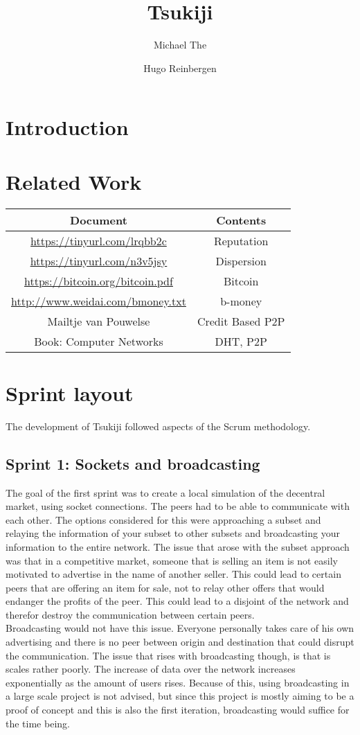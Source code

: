 \documentclass[]{article}
\title{Tsukiji}
\author{Michael The \and Hugo Reinbergen}
\begin{document}
\maketitle

\begin{abstract}

\end{abstract}

\section{Introduction}
\section{Related Work}
\begin{tabular}{|c|c|}
 \hline
 Document & Contents  \\
 \hline
 \url{https://tinyurl.com/lrqbb2c} & Reputation \\
 \url{https://tinyurl.com/n3v5jsy} & Dispersion \\
 \url{https://bitcoin.org/bitcoin.pdf} & Bitcoin \\
 \url{http://www.weidai.com/bmoney.txt} & b-money \\
 Mailtje van Pouwelse & Credit Based P2P \\
 Book: Computer Networks & DHT, P2P \\
 \hline
\end{tabular} 
\section{Sprint layout}
The development of Tsukiji followed aspects of the Scrum methodology.
\subsection{Sprint 1: Sockets and broadcasting}
The goal of the first sprint was to create a local simulation of the decentral market, using socket connections. The peers had to be able to communicate with each other. The options considered for this were approaching a subset and relaying the information of your subset to other subsets and broadcasting your information to the entire network. The issue that arose with the subset approach was that in a competitive market, someone that is selling an item is not easily motivated to advertise in the name of another seller. This could lead to certain peers that are offering an item for sale, not to relay other offers that would endanger the profits of the peer. This could lead to a disjoint of the network and therefor destroy the communication between certain peers. \\
Broadcasting would not have this issue. Everyone personally takes care of his own advertising and there is no peer between origin and destination that could disrupt the communication. The issue that rises with broadcasting though, is that is scales rather poorly. The increase of data over the network increases exponentially as the amount of users rises. Because of this, using broadcasting in a large scale project is not advised, but since this project is mostly aiming to be a proof of concept and this is also the first iteration, broadcasting would suffice for the time being.
\end{document}
